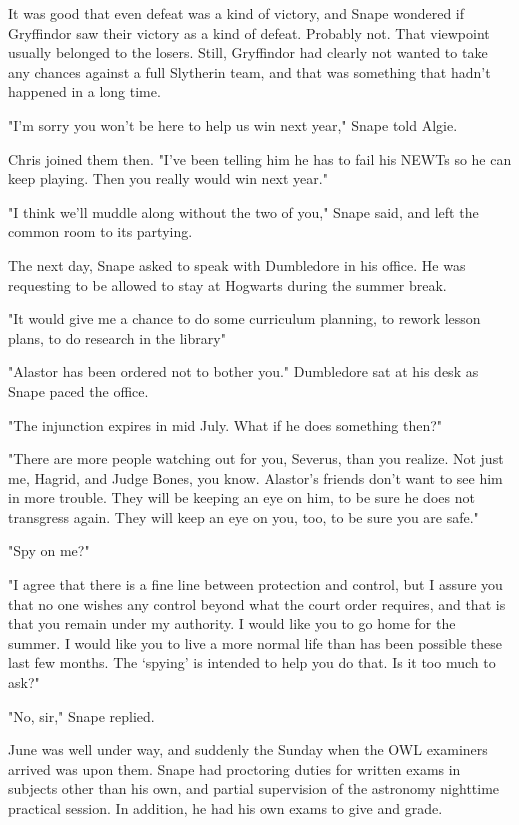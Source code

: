 It was good that even defeat was a kind of victory, and Snape wondered if Gryffindor saw their victory as a kind of defeat. Probably not. That viewpoint usually belonged to the losers. Still, Gryffindor had clearly not wanted to take any chances against a full Slytherin team, and that was something that hadn't happened in a long time.

"I'm sorry you won't be here to help us win next year," Snape told Algie.

Chris joined them then. "I've been telling him he has to fail his NEWTs so he can keep playing. Then you really would win next year."

"I think we'll muddle along without the two of you," Snape said, and left the common room to its partying.

The next day, Snape asked to speak with Dumbledore in his office. He was requesting to be allowed to stay at Hogwarts during the summer break.

"It would give me a chance to do some curriculum planning, to rework lesson plans, to do research in the library{\el}"

"Alastor has been ordered not to bother you." Dumbledore sat at his desk as Snape paced the office.

"The injunction expires in mid July. What if he does something then?"

"There are more people watching out for you, Severus, than you realize. Not just me, Hagrid, and Judge Bones, you know. Alastor's friends don't want to see him in more trouble. They will be keeping an eye on him, to be sure he does not transgress again. They will keep an eye on you, too, to be sure you are safe."

"Spy on me?"

"I agree that there is a fine line between protection and control, but I assure you that no one wishes any control beyond what the court order requires, and that is that you remain under my authority. I would like you to go home for the summer. I would like you to live a more normal life than has been possible these last few months. The `spying' is intended to help you do that. Is it too much to ask?"

"No, sir," Snape replied.

June was well under way, and suddenly the Sunday when the OWL examiners arrived was upon them. Snape had proctoring duties for written exams in subjects other than his own, and partial supervision of the astronomy nighttime practical session. In addition, he had his own exams to give and grade.

